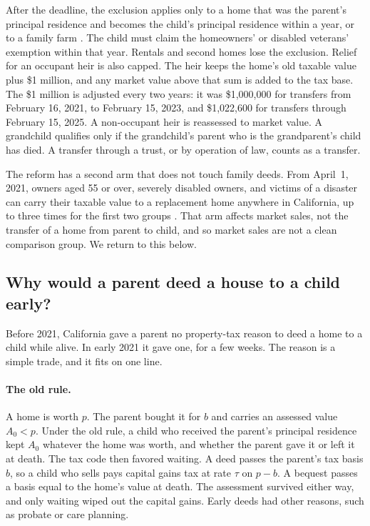 After the deadline, the exclusion applies only to a home that was the parent's principal residence and becomes the child's principal residence within a year, or to a family farm \citep{boe2025prop19, lao2020prop19}. The child must claim the homeowners' or disabled veterans' exemption within that year. Rentals and second homes lose the exclusion. Relief for an occupant heir is also capped. The heir keeps the home's old taxable value plus \$1 million, and any market value above that sum is added to the tax base. The \$1 million is adjusted every two years: it was \$1,000,000 for transfers from February 16, 2021, to February 15, 2023, and \$1,022,600 for transfers through February 15, 2025. A non-occupant heir is reassessed to market value. A grandchild qualifies only if the grandchild's parent who is the grandparent's child has died. A transfer through a trust, or by operation of law, counts as a transfer.

The reform has a second arm that does not touch family deeds. From April~1, 2021, owners aged 55 or over, severely disabled owners, and victims of a disaster can carry their taxable value to a replacement home anywhere in California, up to three times for the first two groups \citep{boe2025prop19}. That arm affects market sales, not the transfer of a home from parent to child, and so market sales are not a clean comparison group. We return to this below.

\subsection{Why would a parent deed a house to a child early?}\label{subsec:framework_v2}

Before 2021, California gave a parent no property-tax reason to deed a home to a child while alive. In early 2021 it gave one, for a few weeks. The reason is a simple trade, and it fits on one line.

\paragraph{The old rule.}
A home is worth $p$. The parent bought it for $b$ and carries an assessed value $A_0<p$. Under the old rule, a child who received the parent's principal residence kept $A_0$ whatever the home was worth, and whether the parent gave it or left it at death. The tax code then favored waiting. A deed passes the parent's tax basis $b$, so a child who sells pays capital gains tax at rate $\tau$ on $p-b$. A bequest passes a basis equal to the home's value at death. The assessment survived either way, and only waiting wiped out the capital gains. Early deeds had other reasons, such as probate or care planning.

